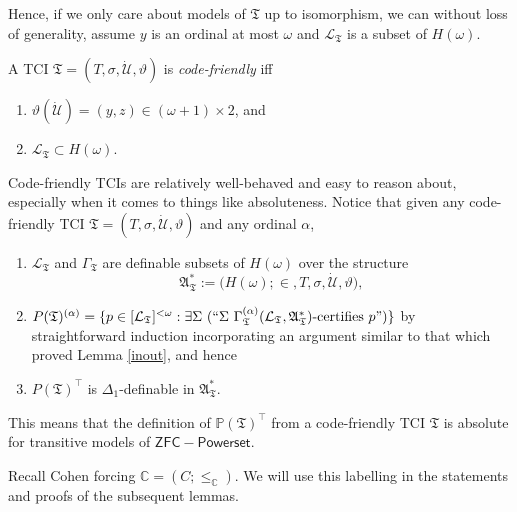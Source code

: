 \documentclass[12pt]{article}
\numberwithin{equation}{section}
\begin{document}
Hence, if we only care about models of $\mathfrak{T}$ up to isomorphism, we can without loss of generality, assume $y$ is an ordinal at most $\omega$ and $\mathcal{L}_{\mathfrak{T}}$ is a subset of $H(\omega)$.

\begin{defi}
A TCI $\mathfrak{T} = (T, \sigma, \dot{\mathcal{U}}, \vartheta)$ is \emph{code-friendly} iff 
\begin{enumerate}[label=(\alph*)]
    \item $\vartheta(\dot{\mathcal{U}}) = (y, z) \in (\omega + 1) \times 2$, and 
    \item $\mathcal{L}_{\mathfrak{T}} \subset H(\omega)$.
\end{enumerate}
\end{defi}

Code-friendly TCIs are relatively well-behaved and easy to reason about, especially when it comes to things like absoluteness. Notice that given any code-friendly TCI $\mathfrak{T} = (T, \sigma, \dot{\mathcal{U}}, \vartheta)$ and any ordinal $\alpha$,
\begin{enumerate}[leftmargin=40pt, label=(CF\arabic*)]
    \item\label{cf1} $\mathcal{L}_{\mathfrak{T}}$ and $\Gamma_{\mathfrak{T}}$ are definable subsets of $H(\omega)$ over the structure $$\mathfrak{A}^*_{\mathfrak{T}} := \mathfrak(H(\omega); \in, T, \sigma, \dot{\mathcal{U}}, \vartheta),$$
    \item $P(\mathfrak{T})^{(\alpha)} = \{p \in [\mathcal{L}_{\mathfrak{T}}]^{< \omega} : \exists \Sigma \ (``\Sigma \ \Gamma_{\mathfrak{T}}^{(\alpha)} (\mathcal{L}_{\mathfrak{T}}, \mathfrak{A}^*_{\mathfrak{T}})\text{-certifies } p")\}$ by straightforward induction incorporating an argument similar to that which proved Lemma \ref{inout}, and hence
    \item $P(\mathfrak{T})^{\top}$ is $\Delta_1$-definable in $\mathfrak{A}^*_{\mathfrak{T}}$.
\end{enumerate}
This means that the definition of $\mathbb{P}(\mathfrak{T})^{\top}$ from a code-friendly TCI $\mathfrak{T}$ is absolute for transitive models of $\mathsf{ZFC - Powerset}$.

Recall Cohen forcing $\mathbb{C} = (C; \leq_{\mathbb{C}})$. We will use this labelling in the statements and proofs of the subsequent lemmas.
\end{document}
